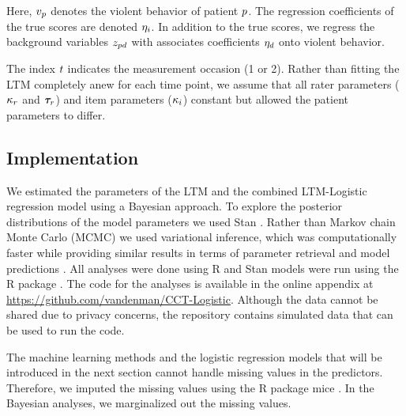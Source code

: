 \documentclass[a4paper,11pt]{article}
\newcommand{\githuburl}{\url{https://github.com/vandenman/CCT-Logistic}}
\begin{document}
Here, $v_{p}$ denotes the violent behavior of patient $p$.
The regression coefficients of the true scores are denoted $\eta_{i}$.
In addition to the true scores, we regress the background variables $z_{pd}$ with associates coefficients $\eta_{d}$ onto violent behavior.

The index $t$ indicates the measurement occasion (1 or 2).
Rather than fitting the LTM completely anew for each time point, we assume that all rater parameters ($\kappa_r$ and $\bm{\tau}_{r}$) and item parameters ($\kappa_i$) constant but allowed the patient parameters to differ.

\subsection{Implementation}
We estimated the parameters of the LTM and the combined LTM-Logistic regression model using a Bayesian approach.
To explore the posterior distributions of the model parameters we used Stan \parencite{CarpenterEtAl2017Stan}.
Rather than Markov chain Monte Carlo (MCMC) we used variational inference, which was computationally faster while providing similar results in terms of parameter retrieval and model predictions \parencite{kucukelbir2017automatic}.
All analyses were done using R \parencite{R} and Stan models were run using the R package  \parencite{cmdstanr}.
The code for the analyses is available in the online appendix at \githuburl{}.
Although the data cannot be shared due to privacy concerns, the repository contains simulated data that can be used to run the code.

The machine learning methods and the logistic regression models that will be introduced in the next section cannot handle missing values in the predictors.
Therefore, we imputed the missing values using the R package mice \parencite{miceRpackage}.
In the Bayesian analyses, we marginalized out the missing values.



\end{document}
